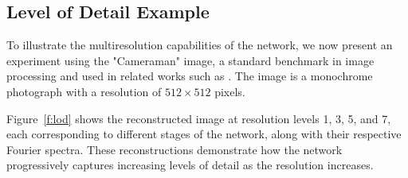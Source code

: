 \subsection{Level of Detail Example}
\label{ss:LOD}

To illustrate the multiresolution capabilities of the network, we now present an experiment using the "Cameraman" image, a standard benchmark in image processing and used in related works such as \citet{sitzmann2019siren}. The image is a monochrome photograph with a resolution of \(512 \times 512\) pixels.

Figure~\ref{f:lod} shows the reconstructed image at resolution levels 1, 3, 5, and 7, each corresponding to different stages of the network, along with their respective Fourier spectra. These reconstructions demonstrate how the network progressively captures increasing levels of detail as the resolution increases.

